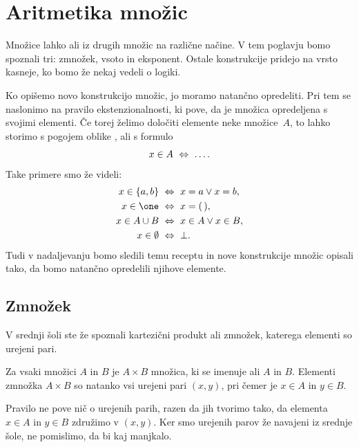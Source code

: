 \chapter{Aritmetika množic}
\label{cha:artimetika-mnozic}

Množice lahko  ali  iz drugih množic na različne načine. V
tem poglavju bomo spoznali tri: zmnožek, vsoto in eksponent.
%
Ostale konstrukcije pridejo na vrsto kasneje, ko bomo že nekaj vedeli o logiki.

Ko opišemo novo konstrukcijo množic, jo moramo natančno opredeliti. Pri tem se naslonimo na pravilo ekstenzionalnosti, ki pove, da je množica opredeljena s svojimi elementi.
%
Če torej želimo določiti elemente neke množice~$A$, to lahko storimo s pogojem oblike
, ali s formulo
%
\begin{equation*}
  x \in A \ \Leftrightarrow\  \ldots.
\end{equation*}
%
Take primere smo že videli:
%
\begin{align*}
  x \in \set{a, b} &\ \liff\  x = a \lor x = b,\\
  x \in \one &\ \liff\  x = \unit,\\
  x \in A \cup B &\ \liff\  x \in A \lor x \in B,\\
  x \in \emptyset &\ \liff\  \bot.
\end{align*}
%
Tudi v nadaljevanju bomo sledili temu receptu in nove konstrukcije množic opisali tako, da bomo natančno opredelili njihove elemente.

\section{Zmnožek}
\label{sec:zmnozek}

V srednji šoli ste že spoznali kartezični produkt ali zmnožek, katerega elementi so urejeni pari.

\begin{pravilo}
  \label{pravilo:zmnozek-tvorba}
  Za vsaki množici $A$ in $B$ je $A \times B$ množica, ki se imenuje  ali
   $A$ in $B$.
  Elementi zmnožka $A \times B$ so natanko vsi urejeni pari $(x, y)$, pri čemer je $x \in A$ in $y \in B$.
\end{pravilo}

Pravilo ne pove nič o urejenih parih, razen da jih tvorimo tako, da elementa $x \in A$ in $y \in B$ združimo v $(x, y)$. Ker smo urejenih parov že navajeni iz srednje šole, ne pomislimo, da bi kaj manjkalo.

